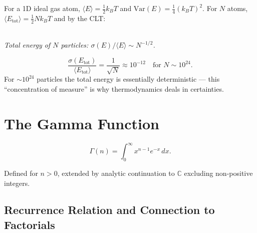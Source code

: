 \begin{example}
For a 1D ideal gas atom, $\langle E\rangle = \tfrac{1}{2}k_B T$ and $\mathrm{Var}(E) = \tfrac{1}{4}(k_B T)^2$. For $N$ atoms, $\langle E_{\text{tot}}\rangle = \tfrac{1}{2}Nk_B T$ and by the CLT:

\begin{center}
\\[3pt]
{\small\itshape Total energy of $N$ particles: $\sigma(E)/\langle E\rangle\sim N^{-1/2}$.}
\end{center}

\begin{equation}
    \frac{\sigma(E_{\text{tot}})}{\langle E_{\text{tot}}\rangle} = \frac{1}{\sqrt{N}} \approx 10^{-12} \quad \text{for } N \sim 10^{24}.
\end{equation}
For $\sim10^{24}$ particles the total energy is essentially deterministic — this ``concentration of measure'' is why thermodynamics deals in certainties.
\end{example}

\section{The Gamma Function}

\begin{definition}
\begin{equation}
    \Gamma(n) = \int_0^\infty x^{n-1} e^{-x}\,dx.
\end{equation}
\end{definition}
Defined for $n > 0$, extended by analytic continuation to $\mathbb{C}$ excluding non-positive integers.

\subsection{Recurrence Relation and Connection to Factorials}

